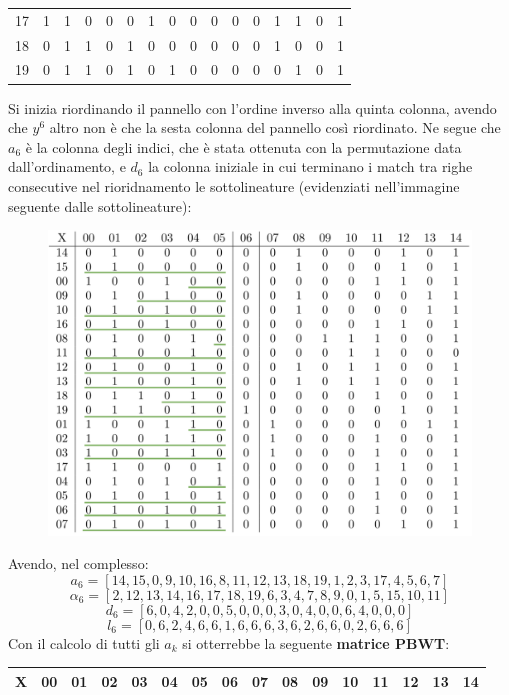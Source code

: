 \begin{esempio}
\begin{table}[H]
\begin{tabular}{c|ccccccccccccccc}
      17 & 1 & 1 & 0 & 0 & 0 & 1 & 0 & 0 & 0 & 0 & 0 & 1 & 1 & 0 & 1 \\
      18 & 0 & 1 & 1 & 0 & 1 & 0 & 0 & 0 & 0 & 0 & 0 & 1 & 0 & 0 & 1 \\
      19 & 0 & 1 & 1 & 0 & 1 & 0 & 1 & 0 & 0 & 0 & 0 & 0 & 1 & 0 & 1 
    \end{tabular}
  \end{table}
  Si inizia riordinando il pannello con l'ordine inverso alla
  quinta colonna, avendo che $y^6$ altro non è che la sesta colonna del pannello
  così riordinato. Ne segue che $a_6$ è la colonna degli indici, che è stata
  ottenuta con la permutazione data dall'ordinamento, e $d_6$ la
  colonna iniziale in cui terminano i match tra righe consecutive nel
  rioridnamento le sottolineature (evidenziati nell'immagine seguente dalle
  sottolineature):   
  \begin{figure}[H]
    \centering
    \includegraphics[scale = 0.315]{img/matrix1.pdf}
  \end{figure}
  \noindent
  Avendo, nel complesso:
  \[a_6=[14,15,0,9,10,16,8,11,12,13,18,19,1,2,3,17,4,5,6,7]\]
  \[\alpha_6=[2,12,13,14,16,17,18,19,6,3,4,7,8,9,0,1,5,15,10,11]\]
  \[d_6=[6,0,4,2,0,0,5,0,0,0,3,0,4,0,0,6,4,0,0,0]\]
  \[l_6=[0,6,2,4,6,6,1,6,6,6,3,6,2,6,6,0,2,6,6,6]\]
  Con il calcolo di tutti gli $a_k$ si otterrebbe la seguente \textbf{matrice
    PBWT}: 
  \begin{table}[H]
  \centering
  \scriptsize
  \begin{tabular}{c|ccccccccccccccc}
    X & 00 & 01 & 02 & 03 & 04 & 05 & 06 & 07 & 08 & 09 & 10 & 11 & 12 & 13
    & 14 \\
    \hline

\end{tabular}
\end{table}
\end{esempio}
